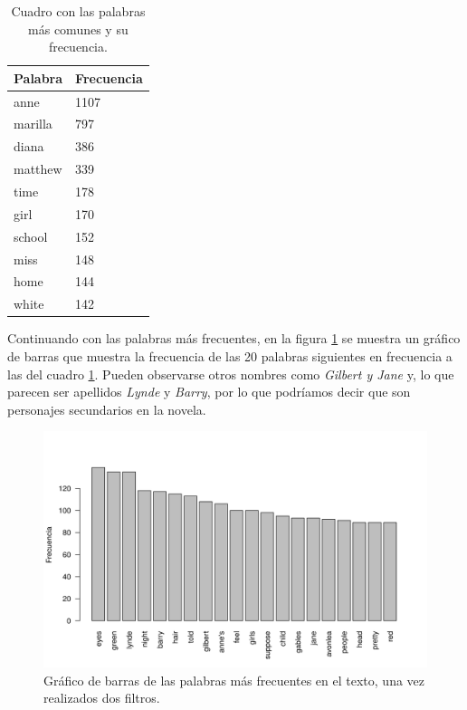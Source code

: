 \documentclass[12pt]{article}
\begin{document}
	\begin{table}
		\centering
		\caption{Cuadro con las palabras más comunes y su frecuencia.}
		\label{frecuencia_palabras}
		\begin{tabular}{l|l}
			\hline
			Palabra & Frecuencia \\
			\hline
			anne & 1107\\
			marilla & 797\\
			diana & 386\\
			matthew & 339\\
			time & 178\\
			girl & 170\\
			school & 152\\
			miss & 148\\
			home & 144\\
			white & 142\\
			\hline
		\end{tabular}
	\end{table}

	Continuando con las palabras más frecuentes, en la figura \ref{palabras_dec} se muestra un gráfico de barras que muestra la frecuencia de las 20 palabras siguientes en frecuencia a las del cuadro \ref{frecuencia_palabras}. Pueden observarse otros nombres como \textit{Gilbert y Jane} y, lo que parecen ser apellidos \textit{Lynde} y \textit{Barry}, por lo que podríamos decir que son personajes secundarios en la novela. 
	
	\begin{figure}
		\centering
		\includegraphics[scale=0.7]{palabras_decreciente_log3.png}
		\caption{Gráfico de barras de las palabras más frecuentes en el texto, una vez realizados dos filtros.}
		\label{palabras_dec}
	\end{figure}
	
\end{document}
